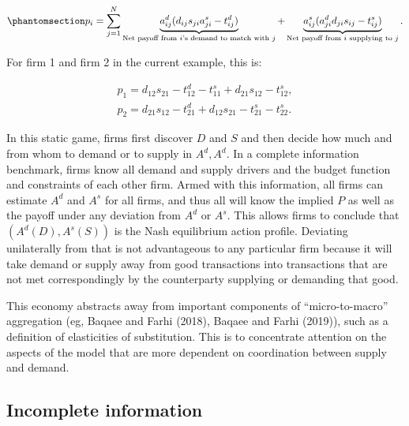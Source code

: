 \documentclass[
]{article}
\theoremstyle{plain}
\theoremstyle{definition}
\theoremstyle{remark}
\begin{document}
\begin{equation}\phantomsection\label{eq-firmlevelpayoff}{
p_i = \sum_{j=1}^N \underbrace{a_{ij}^d (d_{ij} s_{ji} a_{ji}^s - t_{ij}^d)}_{\text{Net payoff from $i$'s demand to match with $j$}} + \underbrace{a_{ij}^s (a_{ji}^d d_{ji} s_{ij} - t_{ij}^s)}_{\text{Net payoff from $i$ supplying to $j$}}.
}\end{equation}

For firm 1 and firm 2 in the current example, this is:

\[
\begin{split}
p_1 = d_{12} s_{21} - t_{12}^d - t_{11}^s + d_{21} s_{12} - t_{12}^s, \\
p_2 = d_{21} s_{12} -t_{21}^d + d_{12} s_{21} - t_{21}^s - t_{22}^s.
\end{split}
\]

In this static game, firms first discover \(D\) and \(S\) and then
decide how much and from whom to demand or to supply in \(A^d, A^d\). In
a complete information benchmark, firms know all demand and supply
drivers and the budget function and constraints of each other firm.
Armed with this information, all firms can estimate \(A^d\) and \(A^s\)
for all firms, and thus all will know the implied \(P\) as well as the
payoff under any deviation from \(A^d\) or \(A^s\). This allows firms to
conclude that \((A^d(D), A^s(S))\) is the Nash equilibrium action
profile. Deviating unilaterally from that is not advantageous to any
particular firm because it will take demand or supply away from good
transactions into transactions that are not met correspondingly by the
counterparty supplying or demanding that good.

This economy abstracts away from important components of
``micro-to-macro'' aggregation (eg, Baqaee and Farhi (2018), Baqaee and
Farhi (2019)), such as a definition of elasticities of substitution.
This is to concentrate attention on the aspects of the model that are
more dependent on coordination between supply and demand.

\subsection{Incomplete information}\label{incomplete-information}
\end{document}
